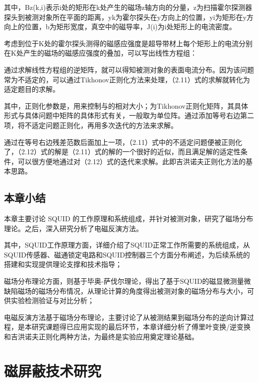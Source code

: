 \documentclass[a4paper,12pt，twoside]{ctexart}
\begin{document}
	其中，Bz(k,i)表示i处的矩形在k处产生的磁场z轴方向的分量，z为扫描霍尔探测器探头到被测对象所在平面的距离，yk为霍尔探头在y方向上的位置，yi为矩形在y方向上的位置，b为矩形宽度，真空中的磁导率，J(i)为i处矩形上的电流密度。\par
	
	考虑到位于K处的霍尔探头测得的磁感应强度是超导带材上每个矩形上的电流分别在K处产生的磁场的磁感应强度的叠加，可以写出线性方程组：\par

	通过求解线性方程组的逆矩阵，就可以得知被测对象的表面电流分布。因为该问题常为不适定的，可以通过Tikhonov正则化方法来处理，（2.11）式的求解就转化为适定题目的求解。\par

	其中，正则化参数是，用来控制与的相对大小；为Tikhonov正则化矩阵，其具体形式与具体问题中矩阵的具体形式有关，一般取为单位阵。通过添加等号右边第二项，将不适定问题正则化，再用多次迭代的方法来求解。\par
	通过在等号右边残差范数后面加上一项，（2.11）式中的不适定问题便被正则化了，（2.12）式的解是（2.11）式的解的一个很好的近似，而且满足解的适定性条件，可以很方便地通过对（2.12）式的迭代来求解。此即吉洪诺夫正则化方法的基本思路。

	
	\subsection{本章小结}

	本章主要讨论 SQUID 的工作原理和系统组成，并针对被测对象，研究了磁场分布理论。之后，深入研究分析了电磁反演方法。\par
	其中，SQUID工作原理方面，详细介绍了SQUID正常工作所需要的系统组成，从SQUID传感器、磁通锁定电路和SQUID控制器三个方面分布阐述，为后续系统的搭建和实现提供理论支撑和技术指导；\par
	磁场分布理论方面，则基于毕奥-萨伐尔理论，得出了基于SQUID的磁显微测量微缺陷磁场的磁场分布情况，从理论计算的角度得出被测对象的磁场分布与大小，可供实验检测验证与对比分析；\par
	电磁反演方法基于磁场分布理论，主要讨论了从被测结果到磁场分布的逆向计算过程，是本研究课题得已应用实现的最后环节，本章详细分析了傅里叶变换/逆变换和吉洪诺夫正则化两种方法，为最终是实验应用奠定理论基础。
	
	
	\newpage
	\section{磁屏蔽技术研究}
\end{document}
